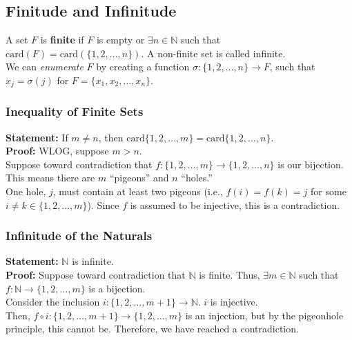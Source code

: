 \documentclass[10pt]{extarticle}
\begin{document}
    \subsection{Finitude and Infinitude}%
      A set $F$ is \textbf{finite} if $F$ is empty or $\exists n\in \mathbb{N}$ such that $\text{card}(F) = \text{card}\left(\{1,2,\dots,n\}\right)$. A non-finite set is called infinite.\\

      We can \textsl{enumerate} $F$ by creating a function $\sigma: \{1,2,\dots,n\}\rightarrow F$, such that $x_j = \sigma(j)$ for $F = \{x_1,x_2,\dots,x_n\}$.
      \subsubsection{Inequality of Finite Sets}%
      \textbf{Statement:} If $m\neq n$, then $\text{card}\{1,2,\dots,m\} = \text{card}\{1,2,\dots,n\}$.\\
      
      \textbf{Proof:} WLOG, suppose $m>n$.\\

      Suppose toward contradiction that $f: \{1,2,\dots,m\} \rightarrow \{1,2,\dots,n\}$ is our bijection. This means there are $m$ ``pigeons'' and $n$ ``holes.''\\

      One hole, $j$, must contain at least two pigeons (i.e., $f(i) = f(k) = j$ for some $i\neq k\in \{1,2,\dots,m\}$). Since $f$ is assumed to be injective, this is a contradiction.\\
      \subsubsection{Infinitude of the Naturals}%
      \textbf{Statement:} $\mathbb{N}$ is infinite.\\

      \textbf{Proof:} Suppose toward contradiction that $\mathbb{N}$ is finite. Thus, $\exists m\in \mathbb{N}$ such that $f:\mathbb{N} \rightarrow \{1,2,\dots,m\}$ is a bijection.\\

      Consider the inclusion $i: \{1,2,\dots,m+1\}\rightarrow \mathbb{N}$. $i$ is injective.\\

      Then, $f\circ i: \{1,2,\dots,m+1\} \rightarrow \{1,2,\dots,m\}$ is an injection, but by the pigeonhole principle, this cannot be. Therefore, we have reached a contradiction.\\
\end{document}
